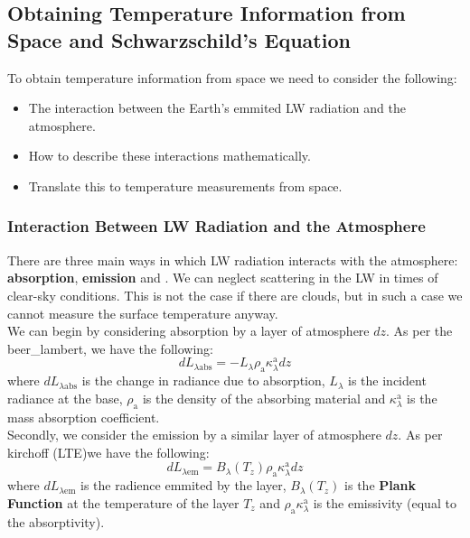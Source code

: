 \subsection{Obtaining Temperature Information from Space and Schwarzschild's 
Equation}
\label{sec:schwarzschild}

To obtain temperature information from space we need to consider the following:
\begin{itemize}
    \item The interaction between the Earth's emmited \gls{LW} radiation and the
    atmosphere.
    \item How to describe these interactions mathematically.
    \item Translate this to temperature measurements from space.
\end{itemize}

\subsubsection{Interaction Between LW Radiation and the Atmosphere}
\label{sec:lw_atm}

There are three main ways in which \gls{LW} radiation interacts with the 
atmosphere: \textbf{absorption}, \textbf{emission} and 
. We can neglect scattering in the \gls{LW} in times
of clear-sky conditions. This is not the case if there are clouds, but in such a
case we cannot measure the surface temperature anyway.\\

We can begin by considering absorption by a layer of atmosphere $dz$. As per the
\gls{beer_lambert}, we have the following:
$$
dL_{\lambda \text{abs}} = -L_\lambda \rho_{\text{a}} \kappa_\lambda^{\text{a}} dz
$$
where $dL_{\lambda \text{abs}}$ is the change in radiance due to absorption,
$L_\lambda$ is the incident radiance at the base, $\rho_{\text{a}}$ is the density
of the absorbing material and $\kappa_\lambda^{\text{a}}$ is the mass absorption 
coefficient.\\

Secondly, we consider the emission by a similar layer of atmosphere $dz$. As per
\gls{kirchoff} (\gls{LTE})we have the following:
$$
dL_{\lambda \text{em}} = B_\lambda(T_z) \rho_{\text{a}} \kappa_\lambda^{\text{a}} dz
$$
where $dL_{\lambda \text{em}}$ is the radience emmited by the layer, $B_\lambda(T_z)$
is the \textbf{Plank Function} at the temperature of the layer $T_z$ and
$\rho_{\text{a}} \kappa_\lambda^{\text{a}}$ is the \gls{emissivity} (equal to the
\gls{absorptivity}).

